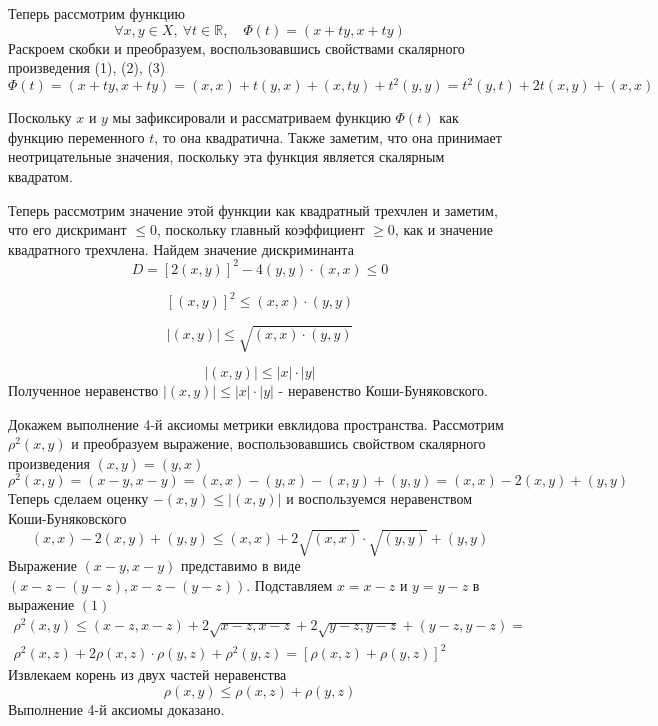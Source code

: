 Теперь рассмотрим функцию 
$$
\forall x,y \in X, \ \forall t \in \mathbb {R}, \quad \Phi(t) = (x +ty, x + ty)
$$
Раскроем скобки и преобразуем, воспользовавшись свойствами скалярного произведения (1), (2), (3)
$$
\Phi(t) = (x +ty, x + ty) = (x, x) + t(y, x) + (x, ty) + t^2(y, y) = t^2(y, t) + 2t(x, y) + (x, x)
$$

Поскольку $x$ и $y$ мы зафиксировали и рассматриваем  функцию $\Phi(t)$ как функцию переменного $t$, то она квадратична. Также заметим, что она принимает неотрицательные значения, поскольку эта функция является скалярным квадратом.

Теперь рассмотрим значение этой функции как квадратный трехчлен и заметим, что его дискримант $\leq 0$, поскольку главный коэффициент $\geq 0$, как и значение квадратного трехчлена. Найдем значение дискриминанта 
$$
D = [2(x, y)]^2 - 4(y, y) \cdot (x, x) \leq 0
$$

$$
[(x, y)]^2 \leq (x, x) \cdot (y, y)
$$

$$
|(x, y)| \leq \sqrt{(x, x) \cdot (y, y)}
$$

$$
|(x, y)| \leq |x| \cdot |y|
$$
Полученное неравенство $|(x, y)| \leq |x| \cdot |y|$ - неравенство Коши-Буняковского.

Докажем выполнение 4-й аксиомы метрики евклидова пространства. Рассмотрим $\rho^2(x, y)$ и преобразуем выражение, воспользовавшись свойством скалярного произведения $(x, y) = (y, x)$
$$
\rho^2(x, y) = (x - y, x - y) = (x, x) - (y, x) - (x, y) + (y, y) = (x, x) - 2(x, y) + (y, y)
$$
Теперь сделаем оценку $-(x, y) \leq |(x, y)|$ и воспользуемся неравенством Коши-Буняковского
\begin{equation}
(x, x) - 2(x, y) + (y, y) \leq (x, x) + 2 \sqrt{(x, x)} \cdot \sqrt{(y, y)} + (y, y)
\end{equation}
Выражение $(x - y, x - y)$ представимо в виде $(x - z - (y - z), x - z - (y - z))$. Подставляем $x = x - z$ и $y = y - z$ в выражение $(1)$
\begin{equation*}
\begin{gathered}
\rho^2(x, y) \leq (x - z, x - z) + 2\sqrt{x - z, x - z} + 2\sqrt{y - z, y - z} + (y - z, y - z) = \\
\rho^2(x, z) + 2\rho(x, z) \cdot \rho(y, z) + \rho^2(y, z) = [\rho(x, z) + \rho(y, z)]^2
\end{gathered}
\end{equation*}
Извлекаем корень из двух частей неравенства
$$
\rho(x, y) \leq \rho(x, z) + \rho(y, z)
$$
Выполнение 4-й аксиомы доказано.

